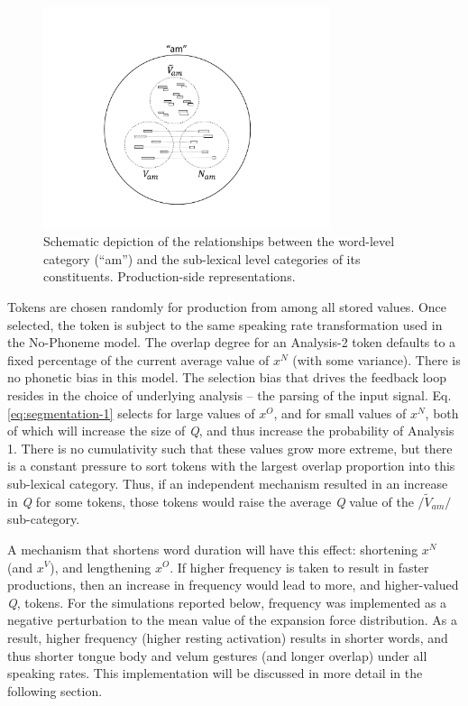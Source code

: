 \begin{figure}[H]

\includegraphics[width=0.75\textwidth]{figures/MultiParseModel.pdf}\caption{\label{fig:MultiParse-Reps}Schematic depiction of the relationships
between the word-level category (“am”) and the sub-lexical level
categories of its constituents. Production-side representations.}

\end{figure}

Tokens are chosen randomly for production from among all stored values.
Once selected, the token is subject to the same speaking rate transformation
used in the No-Phoneme model. The overlap degree for an Analysis-2
token defaults to a fixed percentage of the current average value
of $x^{N}$ (with some variance). There is no phonetic bias in this
model. The selection bias that drives the feedback loop resides in
the choice of underlying analysis – the parsing of the input signal.
Eq. \ref{eq:segmentation-1} selects for large values of $x^{O}$,
and for small values of $x^{N}$, both of which will increase the
size of \emph{Q}, and thus increase the probability of Analysis 1.
There is no cumulativity such that these values grow more extreme,
but there is a constant pressure to sort tokens with the largest overlap
proportion into this sub-lexical category. Thus, if an independent
mechanism resulted in an increase in \emph{Q} for some tokens, those
tokens would raise the average \emph{Q} value of the $/\tilde{V}_{am}/$
sub-category.

A mechanism that shortens word duration will have this effect: shortening
$x^{N}$ (and $x^{V}$), and lengthening $x^{O}$. If higher frequency
is taken to result in faster productions, then an increase in frequency
would lead to more, and higher-valued \emph{Q}, tokens. For the simulations
reported below, frequency was implemented as a negative perturbation
to the mean value of the expansion force distribution. As a result,
higher frequency (higher resting activation) results in shorter words,
and thus shorter tongue body and velum gestures (and longer overlap)
under all speaking rates. This implementation will be discussed in
more detail in the following section. 

